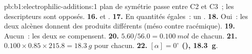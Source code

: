 \begin{solution}{pb:b1:electrophilic-additions:1}
plan de symétrie passe entre C2 et C3~; les descripteurs sont opposés.
\textbf{16.}  et .
\textbf{17.} En quantités égales~: un .
\textbf{18.} Oui~: les deux alcènes  donnent des
produits différents (méso contre racémique).
\textbf{19.} Aucun~: les deux  se compensent.
\textbf{20.} $5.60/56.0 = \qty{0.100}{mol}$ de chacun.
\textbf{21.} $0.100 \times 0.85 \times 215.8 = \qty{18.3}{g}$ pour chacun.
\textbf{22.} \textbf{$[\alpha] = 0^\circ$ (), \qty{18.3}{g}}.
\end{solution}
